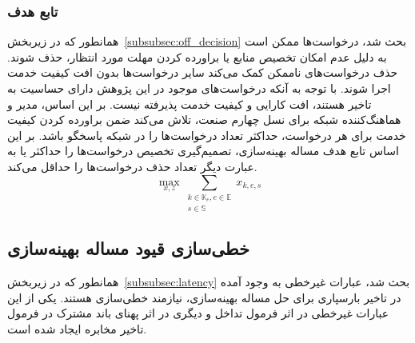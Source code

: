 \subsubsection{تابع هدف}
همانطور که در زیربخش~\ref{subsubsec:off_decision} بحث شد، درخواست‌ها ممکن است به دلیل عدم امکان تخصیص منابع یا براورده کردن مهلت مورد انتظار، حذف شوند. حذف درخواست‌های ناممکن کمک می‌کند سایر درخواست‌ها بدون افت کیفیت خدمت اجرا شوند. با توجه به آنکه درخواست‌های موجود در این پژوهش دارای حساسیت به تاخیر هستند، افت کارایی و کیفیت خدمت پذیرفته نیست. بر این اساس، مدیر و هماهنگ‌کننده شبکه  برای نسل چهارم صنعت، تلاش می‌کند ضمن براورده کردن کیفیت خدمت برای هر درخواست، حداکثر تعداد درخواست‌ها را در شبکه پاسخگو باشد. بر این اساس تابع هدف مساله بهینه‌سازی، تصمیم‌گیری تخصیص‌ درخواست‌ها را حداکثر یا به عبارت دیگر تعداد حذف درخواست‌ها را حداقل می‌کند.
\begin{equation} \label{eq:goal_func}
    \max_{x,z} \sum_{\substack{k \in \mathbb{K}_e, e \in \mathbb{E}\\ s \in \mathbb{S}}} x_{k,e,s}
\end{equation}

\subsection{خطی‌سازی قیود مساله بهینه‌سازی}
همانطور که در زیربخش~\ref{subsubsec:latency} بحث شد، عبارات غیرخطی به وجود آمده در تاخیر بارسپاری برای حل مساله بهینه‌سازی، نیازمند خطی‌سازی هستند. یکی از این عبارات غیرخطی در اثر فرمول تداخل و دیگری در اثر پهنای باند مشترک در فرمول تاخیر مخابره ایجاد شده است.
